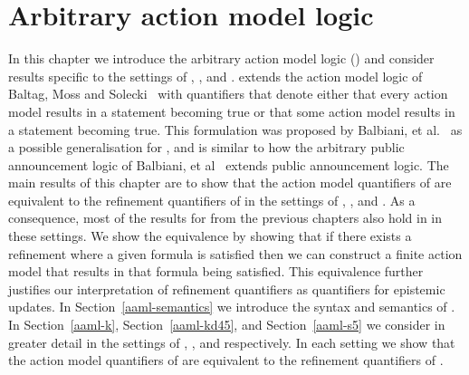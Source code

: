 \chapter{Arbitrary action model logic}\label{aaml}

In this chapter we introduce the arbitrary action model logic (\logicAaml{}) and consider results specific to the settings of \classK{}, \classKFF{}, and \classS{}.
\logicAaml{} extends the action model logic of Baltag, Moss and Solecki~\cite{baltag:1998,baltag:2004} with quantifiers that denote either that every action model results in a statement becoming true or that some action model results in a statement becoming true.
This formulation was proposed by Balbiani, et al.~\cite{balbiani:2007} as a possible generalisation for \logicApal{}, and is similar to how the arbitrary public announcement logic of Balbiani, et al~\cite{balbiani:2008} extends public announcement logic.
The main results of this chapter are to show that the action model quantifiers of \logicAaml{} are equivalent to the refinement quantifiers of \logicRml{} in the settings of \classK{}, \classKFF{}, and \classS{}.
As a consequence, most of the results for \logicRml{} from the previous chapters also hold in \logicAaml{} in these settings.
We show the equivalence by showing that if there exists a refinement where a given formula is satisfied then we can construct a finite action model that results in that formula being satisfied.
This equivalence further justifies our interpretation of refinement quantifiers as quantifiers for epistemic updates.
In Section~\ref{aaml-semantics} we introduce the syntax and semantics of \logicAaml{}.
In Section~\ref{aaml-k}, Section~\ref{aaml-kd45}, and Section~\ref{aaml-s5} we consider \logicAaml{} in greater detail in the settings of \classK{}, \classKFF{}, and \classS{} respectively.
In each setting we show that the action model quantifiers of \logicAaml{} are equivalent to the refinement quantifiers of \logicRml{}.





